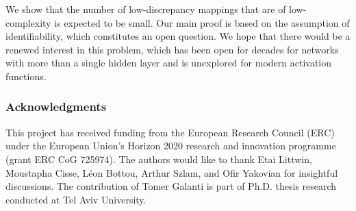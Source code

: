 \documentclass{article} %
\begin{document}
We show that the number of low-discrepancy mappings that are of low-complexity is expected to be small. Our main proof is based on the assumption of identifiability, which constitutes an open question. We hope that there would be a renewed interest in this problem, which has been open for decades for networks with more than a single hidden layer and is unexplored for modern activation functions.

\subsubsection*{Acknowledgments}

This project has received funding from the European Research Council (ERC) under the European Union's Horizon 2020 research and innovation programme (grant ERC CoG 725974). The authors would like to thank Etai Littwin, Moustapha Cisse, L\'eon Bottou, Arthur Szlam, and Ofir Yakovian for insightful discussions. The contribution of Tomer Galanti is part of Ph.D. thesis research conducted at Tel Aviv University. 






\newpage
\end{document}
